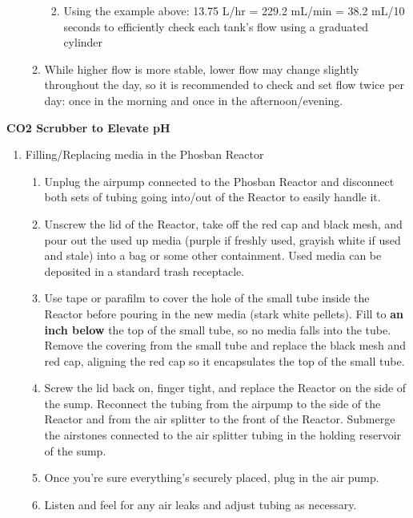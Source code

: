 \documentclass[]{book}
\providecommand{\tightlist}{%
  \setlength{\itemsep}{0pt}\setlength{\parskip}{0pt}}
\begin{document}
\begin{enumerate}
\begin{enumerate}
    \begin{enumerate}
    \def\labelenumiii{\arabic{enumiii}.}
    \tightlist
    \item
      Using the example above: 13.75 L/hr = 229.2 mL/min = 38.2 mL/10
      seconds to efficiently check each tank's flow using a graduated
      cylinder
    \end{enumerate}
  \item
    While higher flow is more stable, lower flow may change slightly
    throughout the day, so it is recommended to check and set flow twice
    per day: once in the morning and once in the afternoon/evening.
  \end{enumerate}
\end{enumerate}

 \textbf{CO2 Scrubber to Elevate pH}

\begin{enumerate}
\def\labelenumi{\arabic{enumi}.}
\tightlist
\item
  Filling/Replacing media in the Phosban Reactor

  \begin{enumerate}
  \def\labelenumii{\arabic{enumii}.}
  \tightlist
  \item
    Unplug the airpump connected to the Phosban Reactor and disconnect
    both sets of tubing going into/out of the Reactor to easily handle
    it.
  \item
    Unscrew the lid of the Reactor, take off the red cap and black mesh,
    and pour out the used up media (purple if freshly used, grayish
    white if used and stale) into a bag or some other containment. Used
    media can be deposited in a standard trash receptacle.
  \item
    Use tape or parafilm to cover the hole of the small tube inside the
    Reactor before pouring in the new media (stark white pellets). Fill
    to \textbf{an inch below} the top of the small tube, so no media
    falls into the tube. Remove the covering from the small tube and
    replace the black mesh and red cap, aligning the red cap so it
    encapsulates the top of the small tube.
  \item
    Screw the lid back on, finger tight, and replace the Reactor on the
    side of the sump. Reconnect the tubing from the airpump to the side
    of the Reactor and from the air splitter to the front of the
    Reactor. Submerge the airstones connected to the air splitter tubing
    in the holding reservoir of the sump.
  \item
    Once you're sure everything's securely placed, plug in the air pump.
  \item
    Listen and feel for any air leaks and adjust tubing as necessary.
  \end{enumerate}
\end{enumerate}
\end{document}
